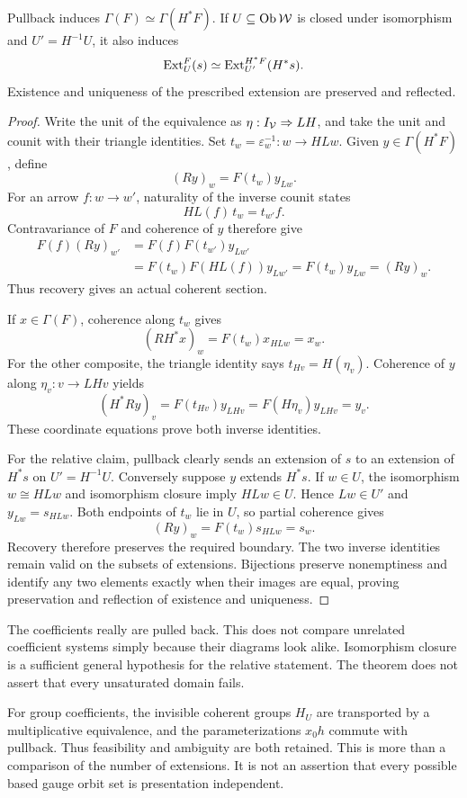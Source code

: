 \begin{proposition}\label{KS37}
Pullback induces \(\Gamma(F)\simeq\Gamma(H^*F)\). If \(U\subseteq\operatorname{Ob}\mathcal W\) is closed under isomorphism and \(U'=H^{-1}U\), it also induces
\[
 \operatorname{Ext}_U^F(s)\simeq\operatorname{Ext}_{U'}^{H^*F}(H^*s).
\]
Existence and uniqueness of the prescribed extension are preserved and reflected.
\end{proposition}
\begin{proof}
Write the unit of the equivalence as $\eta:I_\mathcal V\Rightarrow LH$, and take the unit and counit with their triangle identities. Set $t_w=\varepsilon_w^{-1}:w\to HLw$. Given $y\in\Gamma(H^*F)$, define
\[
 (Ry)_w=F(t_w)y_{Lw}.
\]
For an arrow $f:w\to w'$, naturality of the inverse counit states
\[
 HL(f)\,t_w=t_{w'}f.
\]
Contravariance of $F$ and coherence of $y$ therefore give
\[
\begin{aligned}
 F(f)(Ry)_{w'}
 &=F(f)F(t_{w'})y_{Lw'}\\
 &=F(t_w)F(HL(f))y_{Lw'}
 =F(t_w)y_{Lw}=(Ry)_w.
\end{aligned}
\]
Thus recovery gives an actual coherent section.

If $x\in\Gamma(F)$, coherence along $t_w$ gives
\[
 (RH^*x)_w=F(t_w)x_{HLw}=x_w.
\]
For the other composite, the triangle identity says $t_{Hv}=H(\eta_v)$. Coherence of $y$ along $\eta_v:v\to LHv$ yields
\[
 (H^*Ry)_v=F(t_{Hv})y_{LHv}=F(H\eta_v)y_{LHv}=y_v.
\]
These coordinate equations prove both inverse identities.

For the relative claim, pullback clearly sends an extension of $s$ to an extension of $H^*s$ on $U'=H^{-1}U$. Conversely suppose $y$ extends $H^*s$. If $w\in U$, the isomorphism $w\cong HLw$ and isomorphism closure imply $HLw\in U$. Hence $Lw\in U'$ and $y_{Lw}=s_{HLw}$. Both endpoints of $t_w$ lie in $U$, so partial coherence gives
\[
 (Ry)_w=F(t_w)s_{HLw}=s_w.
\]
Recovery therefore preserves the required boundary. The two inverse identities remain valid on the subsets of extensions. Bijections preserve nonemptiness and identify any two elements exactly when their images are equal, proving preservation and reflection of existence and uniqueness.
\end{proof}
The coefficients really are pulled back. This does not compare unrelated coefficient systems simply because their diagrams look alike. Isomorphism closure is a sufficient general hypothesis for the relative statement. The theorem does not assert that every unsaturated domain fails.

For group coefficients, the invisible coherent groups \(H_U\) are transported by a multiplicative equivalence, and the parameterizations \(x_0h\) commute with pullback. Thus feasibility and ambiguity are both retained. This is more than a comparison of the number of extensions. It is not an assertion that every possible based gauge orbit set is presentation independent.

